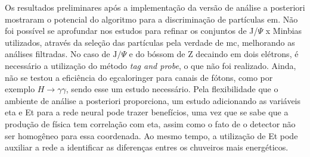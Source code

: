 Os resultados preliminares após a implementação da versão de análise
a posteriori mostraram o potencial do algoritmo para a discriminação de
partículas \gls{em}. Não foi possível se aprofundar nos estudos para refinar os
conjuntos de J/$\Psi$ x Minbias utilizados, através da seleção das partículas pela
verdade de \gls{mc}, melhorando as análises filtradas. No caso de
$\text{J}/\Psi$ e do bóssom de Z decaindo em dois elétrons, é necessário a
utilização do método \emph{tag and probe}, o que não foi realizado.
Ainda, não se testou a eficiência do \gls{egcaloringer} para canais de fótons,
como por exemplo $H\rightarrow\gamma\gamma$, sendo esse um estudo necessário.
Pela flexibilidade que o ambiente de análise a posteriori proporciona, um estudo
adicionando as variáveis \gls{eta} e \gls{Et} para a rede neural pode trazer
benefícios, uma vez que se sabe que a produção de física tem correlação com
\gls{eta}, assim como o fato de o detector não ser homogêneo para essa coordenada.
Ao mesmo tempo, a utilização de \gls{Et} pode auxiliar a rede a identificar as
diferenças entres os chuveiros mais energéticos.




